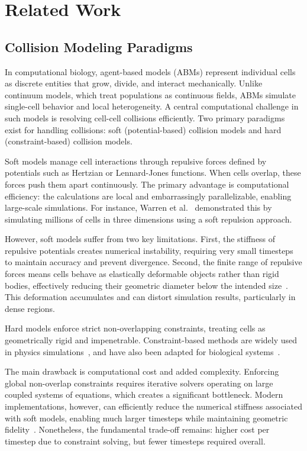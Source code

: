 \documentclass[conference]{IEEEtran}
\begin{document}
\section{Related Work}

\subsection{Collision Modeling Paradigms}

In computational biology, agent-based models (ABMs) represent individual cells as discrete entities that grow, divide, and interact mechanically. Unlike continuum models, which treat populations as continuous fields, ABMs simulate single-cell behavior and local heterogeneity. A central computational challenge in such models is resolving cell-cell collisions efficiently. Two primary paradigms exist for handling collisions: soft (potential-based) collision models and hard (constraint-based) collision models.

\begin{description}[style=nextline]
    \item[Soft (Potential-Based) Models]
        Soft models manage cell interactions through repulsive forces defined by potentials such as Hertzian or Lennard-Jones functions. When cells overlap, these forces push them apart continuously. The primary advantage is computational efficiency: the calculations are local and embarrassingly parallelizable, enabling large-scale simulations. For instance, Warren et al.~\cite{Warren2019} demonstrated this by simulating millions of cells in three dimensions using a soft repulsion approach.

        However, soft models suffer from two key limitations. First, the stiffness of repulsive potentials creates numerical instability, requiring very small timesteps to maintain accuracy and prevent divergence. Second, the finite range of repulsive forces means cells behave as elastically deformable objects rather than rigid bodies, effectively reducing their geometric diameter below the intended size~\cite{Yan2019}. This deformation accumulates and can distort simulation results, particularly in dense regions.

    \item[Hard (Constraint-Based) Models]
        Hard models enforce strict non-overlapping constraints, treating cells as geometrically rigid and impenetrable. Constraint-based methods are widely used in physics simulations~\cite{Tasora2008,Macklin2014,Li2021,Ferguson2021,Yan_2020}, and have also been adapted for biological systems~\cite{Rudge2012,Weady2024,Yan2019}.

        The main drawback is computational cost and added complexity. Enforcing global non-overlap constraints requires iterative solvers operating on large coupled systems of equations, which creates a significant bottleneck. Modern implementations, however, can efficiently reduce the numerical stiffness associated with soft models, enabling much larger timesteps while maintaining geometric fidelity~\cite{Yan2019}. Nonetheless, the fundamental trade-off remains: higher cost per timestep due to constraint solving, but fewer timesteps required overall.
\end{description}
\end{document}
